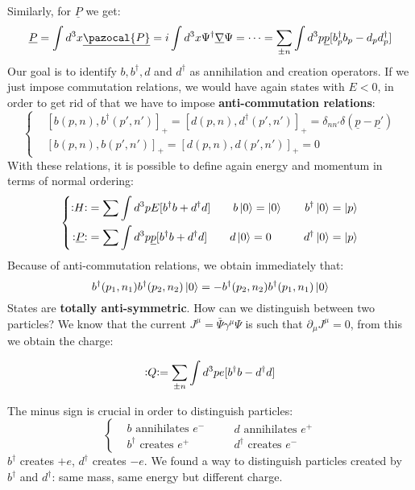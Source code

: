 \documentclass[../main.tex]{subfiles}
\begin{document}
Similarly, for $\underline{P}$ we get:
\[
\underline{P}=\int d^3x\underline{\pazocal{P}}=i\int d^3x\Psi^\dagger\underline{\nabla}\Psi=\dots=\sum_{\pm n}\int d^3p\underline{p}[b^\dagger_pb_p-d_pd^\dagger_p]
\]
Our goal is to identify $b,b^\dagger,d$ and $d^\dagger$ as annihilation and creation operators. If we just impose commutation relations, we would have again states with $E<0$, in order to get rid of that we have to impose \textbf{anti-commutation relations}:
\[
\left\{
\begin{aligned}
&[b(p,n),b^\dagger(p',n')]_+=[d(p,n),d^\dagger(p',n')]_+=\delta_{nn'}\delta(\underline{p}-\underline{p'})\\
&[b(p,n),b(p',n')]_+=[d(p,n),d(p',n')]_+=0
\end{aligned}
\right.
\]
With these relations, it is possible to define again energy and momentum in terms of normal ordering:
\[
\left\{
\begin{aligned}
\vcentcolon\mathrel{H}\vcentcolon&=\sum\int d^3pE[b^\dagger b+d^\dagger d] \quad \quad b\ket{0}=\ket{0} \quad &b^\dagger\ket{0}=\ket{p}\\
\vcentcolon\mathrel{\underline{P}}\vcentcolon&=\sum\int d^3p\underline{p}[b^\dagger b+d^\dagger d] \quad \quad d\ket{0}=0 \quad &d^\dagger\ket{0}=\ket{p}
\end{aligned}
\right.
\]
Because of anti-commutation relations, we obtain immediately that:
\[
b^\dagger(p_1,n_1)b^\dagger(p_2,n_2)\ket{0}=-b^\dagger(p_2,n_2)b^\dagger(p_1,n_1)\ket{0}
\]
States are \textbf{totally anti-symmetric}. How can we distinguish between two particles? We know that the current $J^\mu=\bar{\Psi}\gamma^\mu\Psi$ is such that $\partial_\mu J^\mu=0$, from this we obtain the charge:
\begin{kaobox}[frametitle=Normal ordered charge for the Dirac field]
\[
\vcentcolon\mathrel{Q}\vcentcolon=\sum_{\pm n}\int d^3pe[b^\dagger b-d^\dagger d]
\]
\end{kaobox}
The minus sign is crucial in order to distinguish particles: 
\[
\left\{
\begin{aligned}
&b \text{ annihilates } e^-\\  
&b^\dagger \text{ creates } e^+ 
\end{aligned}
\quad
\begin{aligned}
&d \text{ annihilates } e^+\\
&d^\dagger \text{ creates } e^-
\end{aligned}
\right.
\]$b^\dagger$ creates $+e$, $d^\dagger$ creates $-e$.
We found a way to distinguish particles created by $b^\dagger$ and $d^\dagger$: same mass, same energy but different charge.
\end{document}
